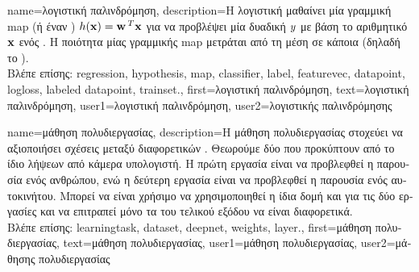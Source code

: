 {name={\foreignlanguage{greek}{λογιστική παλινδρόμηση}}, 
	description={\foreignlanguage{greek}{Η λογιστική} 
		 \foreignlanguage{greek}{μαθαίνει μία γραμμική} \gls{map}  (\foreignlanguage{greek}{ή έναν}  
		) $h({\bf x}) = {\bf w}\,^{T} {\bf x}$ 
		\foreignlanguage{greek}{για να προβλέψει μία δυαδική}  $y$ \foreignlanguage{greek}{με βάση 
		το αριθμητικό}  ${\bf x}$ \foreignlanguage{greek}{ενός} 
		. \foreignlanguage{greek}{Η ποιότητα μίας γραμμικής} \gls{map}  
		\foreignlanguage{greek}{μετράται από τη μέση}  \foreignlanguage{greek}{σε κάποια}
		 (\foreignlanguage{greek}{δηλαδή το} ).\\
		\foreignlanguage{greek}{Βλέπε επίσης:} \gls{regression}, \gls{hypothesis}, \gls{map}, \gls{classifier}, \gls{label}, \gls{featurevec}, 
		\gls{datapoint}, \gls{logloss}, \gls{labeled datapoint}, \gls{trainset}.},
	first={\foreignlanguage{greek}{λογιστική παλινδρόμηση}},
	text={\foreignlanguage{greek}{λογιστική παλινδρόμηση}},
	user1={\foreignlanguage{greek}{λογιστική παλινδρόμηση}}, %
	user2={\foreignlanguage{greek}{λογιστικής παλινδρόμησης}} %
}

{name={\foreignlanguage{greek}{μάθηση πολυδιεργασίας}},
	description={\foreignlanguage{greek}{Η μάθηση πολυδιεργασίας στοχεύει να αξιοποιήσει} 
		\foreignlanguage{greek}{σχέσεις μεταξύ διαφορετικών} . \foreignlanguage{greek}{Θεωρούμε δύο} 
		 \foreignlanguage{greek}{που προκύπτουν από το ίδιο}  
	 	 \foreignlanguage{greek}{λήψεων από κάμερα υπολογιστή. Η πρώτη εργασία είναι να προβλεφθεί η 
		παρουσία ενός ανθρώπου, ενώ η δεύτερη εργασία είναι να προβλεφθεί η παρουσία ενός αυτοκινήτου. 
	 	Μπορεί να είναι χρήσιμο να χρησιμοποιηθεί η ίδια δομή}  \foreignlanguage{greek}{και για τις δύο 
		εργασίες και να επιτραπεί μόνο τα}  \foreignlanguage{greek}{του τελικού} 
		\foreignlanguage{greek}{εξόδου να είναι διαφορετικά.} \\
	 	\foreignlanguage{greek}{Βλέπε επίσης:} \gls{learningtask}, \gls{dataset}, \gls{deepnet}, \gls{weights}, \gls{layer}.},
	first={\foreignlanguage{greek}{μάθηση πολυδιεργασίας}},
	text={\foreignlanguage{greek}{μάθηση πολυδιεργασίας}},
	user1={\foreignlanguage{greek}{μάθηση πολυδιεργασίας}}, %
	user2={\foreignlanguage{greek}{μάθησης πολυδιεργασίας}} %
}

